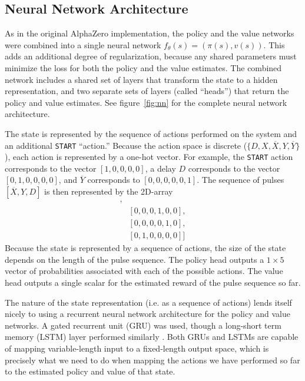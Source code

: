 
\subsection{Neural Network Architecture}

As in the original AlphaZero implementation, the policy and the value networks were combined into a single neural network $f_\theta(s) = (\pi(s), v(s))$. This adds an additional degree of regularization, because any shared parameters must minimize the loss for both the policy and the value estimates. The combined network includes a shared set of layers that transform the state to a hidden representation, and two separate sets of layers (called ``heads'') that return the policy and value estimates. See figure~\ref{fig:nn} for the complete neural network architecture.

The state is represented by the sequence of actions performed on the system and an additional \texttt{START} ``action.''
Because the action space is discrete ($\{ D, X, \overline{X}, Y, \overline{Y} \}$), each action is represented by a one-hot vector. For example, the \texttt{START} action corresponds to the vector $[1,0,0,0,0]$, a delay $D$ corresponds to the vector $[0,1,0,0,0,0]$, and $\overline{Y}$ corresponds to $[0,0,0,0,0,1]$. The sequence of pulses $[\overline{X}, Y, D]$ is then represented by the 2D-array
\begin{align*}
    [&[1,0,0,0,0,0], \\
    &[0,0,0,1,0,0], \\
    &[0,0,0,0,1,0], \\
    &[0,1,0,0,0,0]]
\end{align*}
Because the state is represented by a sequence of actions, the size of the state depends on the length of the pulse sequence.
The policy head outputs a $1 \times 5$ vector of probabilities associated with each of the possible actions. The value head outputs a single scalar for the estimated reward of the pulse sequence so far.

The nature of the state representation (i.e. as a sequence of actions) lends itself nicely to using a recurrent neural network architecture for the policy and value networks. A gated recurrent unit (GRU) was used, though a long-short term memory (LSTM) layer performed similarly \cite{cho2014learning, lstm}.
Both GRUs and LSTMs are capable of mapping variable-length input to a fixed-length output space, which is precisely what we need to do when mapping the actions we have performed so far to the estimated policy and value of that state.

